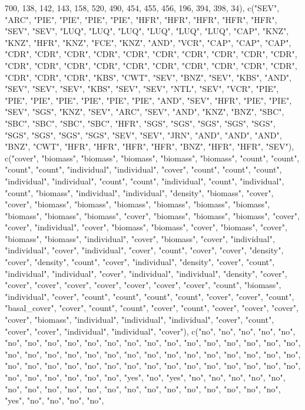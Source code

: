 \documentclass{article}\usepackage[]{graphicx}\usepackage[]{color}
\begin{document}
700, 138, 142, 143, 158, 520, 490, 454, 455, 456, 196, 394, 398, 34), c("SEV", "ARC", "PIE", "PIE", "PIE", "PIE", "HFR", "HFR", "HFR", "HFR", "HFR", "SEV", "SEV", "LUQ", "LUQ", "LUQ", "LUQ", "LUQ", "LUQ", "CAP", "KNZ", "KNZ", "HFR", "KNZ", "FCE", "KNZ", "AND", "VCR", "CAP", "CAP", "CAP", "CDR", "CDR", "CDR", "CDR", "CDR", "CDR", "CDR", "CDR", "CDR", "CDR", "CDR", "CDR", "CDR", "CDR", "CDR", "CDR", "CDR", "CDR", "CDR", "CDR", "CDR", "CDR", "CDR", "KBS", "CWT", "SEV", "BNZ", "SEV", "KBS", "AND", "SEV", "SEV", "SEV", "KBS", "SEV", "SEV", "NTL", "SEV", "VCR", "PIE", "PIE", 
"PIE", "PIE", "PIE", "PIE", "PIE", "AND", "SEV", "HFR", "PIE", "PIE", "SEV", "SGS", "KNZ", "SEV", "ARC", "SEV", "AND", "KNZ", "BNZ", "SBC", "SBC", "SBC", "SBC", "SBC", "HFR", "SGS", "SGS", "SGS", "SGS", "SGS", "SGS", "SGS", "SGS", "SGS", "SEV", "SEV", "JRN", "AND", "AND", "AND", "BNZ", "CWT", "HFR", "HFR", "HFR", "HFR", "BNZ", "HFR", "HFR", "SEV"), c("cover", "biomass", "biomass", "biomass", "biomass", "biomass", "count", "count", "count", "count", "individual", "individual", "cover", "count", "count", "count", "individual", "individual", "count", "count", "individual", "count", "individual", "count", "biomass", "individual", "individual", "density", "biomass", "cover", "cover", "biomass", "biomass", "biomass", "biomass", "biomass", "biomass", "biomass", "biomass", "biomass", "cover", "biomass", "biomass", "biomass", "cover", "cover", "individual", 
"cover", "biomass", "biomass", "cover", "biomass", "cover", "biomass", "biomass", "individual", "cover", "biomass", "cover", "individual", "individual", "cover", "individual", "cover", "count", "cover", "cover", "density", "cover", "density", "count", "cover", "individual", "density", "cover", "count", "individual", "individual", "cover", "individual", "individual", "density", "cover", "cover", "cover", "cover", "cover", "cover", "cover", "cover", "count", "biomass", "individual", "cover", "count", 
"count", "count", "count", "cover", "cover", "count", "basal_cover", "cover", "count", "count", "cover", "count", "cover", "cover", "cover", "cover", "biomass", "individual", "individual", "individual", "cover", "count", "cover", "cover", "individual", "individual", "cover"), c("no", "no", "no", "no", "no", "no", "no", "no", "no", "no", "no", "no", "no", "no", "no", "no", "no", "no", "no", "no", "no", "no", "no", "no", "no", "no", "no", "no", "no", "no", "no", "no", "no", "no", "no", "no", "no", "no", "no", "no", "no", "no", "no", "no", "no", "no", "no", "no", "no", "no", "no", "no", "no", "no", "no", "no", "yes", "no", "yes", "no", "no", "no", "no", "no", "no", "no", "no", "no", "no", "no", "no", "no", "no", "no", "no", "no", "no", "no", "yes", "no", "no", "no", "no", 
\end{document}
